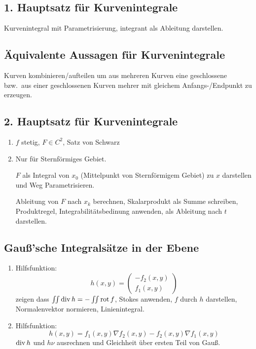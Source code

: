  \subsection{1. Hauptsatz für Kurvenintegrale}
 Kurvenintegral mit Parametrisierung, integrant als Ableitung darstellen.

 \subsection{Äquivalente Aussagen für Kurvenintegrale}
 Kurven kombinieren/aufteilen um aus mehreren Kurven eine geschlossene bzw.\ aus
 einer geschlossenen Kurven mehrer mit gleichem Anfangs-/Endpunkt zu erzeugen.

 \subsection{2. Hauptsatz für Kurvenintegrale}
 \begin{enumerate}
     \item $f$ stetig, $F \in C^2$, Satz von Schwarz
     \item Nur für Sternförmiges Gebiet.

        $F$ als Integral von $x_0$ (Mittelpunkt von Sternförmigem Gebiet) zu $x$
        darstellen und Weg Parametrisieren.

        Ableitung von $F$ nach $x_k$ berechnen, Skalarprodukt als Summe schreiben,
        Produktregel, Integrabilitätsbedinung anwenden, als Ableitung nach $t$
        darstellen.
 \end{enumerate}

 \subsection{Gauß'sche Integralsätze in der Ebene}
 \begin{enumerate}
     \item Hilfsfunktion:
        \begin{equation*}
            h(x,y) =
            \begin{pmatrix}
                -f_2(x,y)\\
                f_1(x,y)
            \end{pmatrix}
        \end{equation*}
        zeigen dass $\iint \operatorname{div} h = - \iint \operatorname{rot} f$, Stokes anwenden, $f$ durch
        $h$ darstellen, Normalenvektor normieren, Linienintegral.
    \item Hilfsfunktion:
        \begin{equation*}
            h(x,y) = f_1(x,y) \nabla f_2(x,y) - f_2(x,y) \nabla f_1(x,y)
        \end{equation*}
        $\operatorname{div} h$ und $h \nu$ ausrechnen und Gleichheit über ersten Teil von Gauß.
 \end{enumerate}
